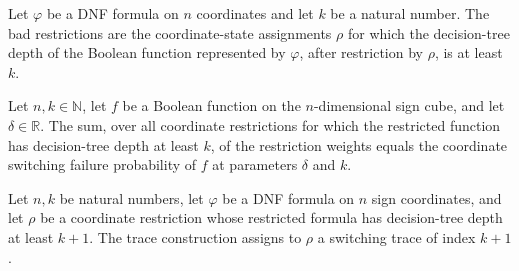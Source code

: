 \begin{definition}
\label{FABL.DNFFormula.SwitchingBad}
\leanok
{}
Let $\varphi$ be a DNF formula on $n$ coordinates and let $k$ be a natural number. The
bad restrictions are the coordinate-state assignments $\rho$ for which the decision-tree
depth of the Boolean function represented by $\varphi$, after restriction by $\rho$, is
at least $k$.
\end{definition}

\begin{theorem}
\label{FABL.DNFFormula.sum_switchingBadWeight_eq_coordSwitchingFailureProbability}
\leanok
{}
Let $n,k\in\mathbb{N}$, let $f$ be a Boolean function on the $n$-dimensional sign cube,
and let $\delta\in\mathbb{R}$. The sum, over all coordinate restrictions for which the
restricted function has decision-tree depth at least $k$, of the restriction weights
equals the coordinate switching failure probability of $f$ at parameters $\delta$ and
$k$.
\end{theorem}

\begin{definition}
\label{FABL.DNFFormula.traceOfSwitchingBad}
\leanok
{}
Let $n,k$ be natural numbers, let $\varphi$ be a DNF formula on $n$ sign coordinates,
and let $\rho$ be a coordinate restriction whose restricted formula has decision-tree
depth at least $k+1$. The trace construction assigns to $\rho$ a switching trace of
index $k+1$.
\end{definition}

